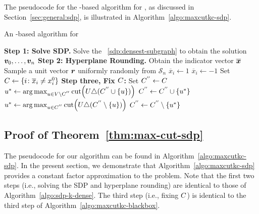 The pseudocode for the {\sdp}-based algorithm for \maxcutkc, as discussed in Section~\ref{sec:general:sdp}, 
is illustrated in Algorithm~\ref{algo:maxcutkc-sdp}.

\begin{algorithm}[H]
\caption{An \sdp-based algorithm for \maxcutkc}
\label{algo:maxcutkc-sdp}
\begin{algorithmic}[1]
\State \textbf{Step 1: Solve SDP.} Solve the \sdp~\eqref{sdp:densest-subgraph} to obtain the solution $\bm{v}_0, \ldots, \bm{v}_n$
\State \textbf{Step 2: Hyperplane Rounding.} Obtain the indicator vector $\overline{\bm{x}}$
\State Sample a unit vector $\bm{r}$ uniformly randomly from $\mathcal{S}_n$
        \State $\overline{x}_i \leftarrow 1$
    \Else
        \State $\overline{x}_i \leftarrow -1$
    \EndIf
\EndFor
\State Set $C \leftarrow \{i \colon \overline{x}_i \neq x^0_i\}$
\State \textbf{Step three, Fix $C$:} Set $C^{''} \gets C$ 
        \State $u^* \leftarrow \arg\max_{u \in V \setminus \FixSelectSet} \cut{\OldSet \symm (\FixSelectSet \cup \{u\})}$
        \State $C^{''} \leftarrow C^{''} \cup \{u^*\}$
        \State $u^* \leftarrow \arg\max_{u \in \FixSelectSet} \cut{\OldSet \symm (\FixSelectSet \setminus \{u\})}$
        \State $C^{''} \leftarrow C^{''} \setminus \{u^*\}$
    \EndIf
\EndWhile
\EndFor 
\State \Return{$\FixSelectSet$}
\end{algorithmic}
\end{algorithm}



\subsection{Proof of Theorem~\ref{thm:max-cut-sdp}}
\label{appendix:mc-proofs:sdp}

The pseudocode for our algorithm can be found in
Algorithm~\ref{algo:maxcutkc-sdp}. In the present section, we demonstrate that
Algorithm~\ref{algo:maxcutkc-sdp} provides a constant factor approximation to
the \maxcutkc problem.
Note that the first two steps (i.e., solving the SDP and hyperplane rounding) are identical to those of Algorithm~\ref{algo:sdp-k-dense}. 
The third step (i.e., fixing $C$) is identical to the third step of Algorithm~\ref{algo:maxcutkc-blackbox}.

